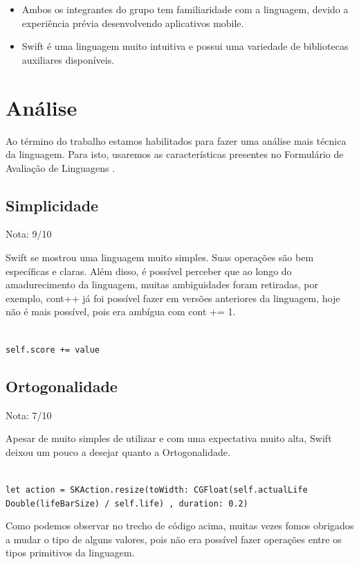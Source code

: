 \documentclass[rel_mlp]{iiufrgs}
\begin{document}
\begin{itemize}[leftmargin=3em]
\setlength{\itemindent}{1em}

    \item Ambos os integrantes do grupo tem familiaridade com a linguagem, devido a experiência prévia desenvolvendo aplicativos mobile.

    \item Swift é uma linguagem muito intuitiva e possui uma variedade de bibliotecas auxiliares disponíveis.

\end{itemize}

\section{Análise}

Ao término do trabalho estamos habilitados para fazer uma análise mais técnica da linguagem. Para isto, usaremos as características presentes no Formulário de Avaliação de Linguagens \cite{catp_01}.

\subsection{Simplicidade}

Nota: 9/10

Swift se mostrou uma linguagem muito simples. Suas operações são bem específicas e claras. Além disso, é possível perceber que ao longo do amadurecimento da linguagem, muitas ambiguidades foram retiradas, por exemplo, cont++ já foi possível fazer em versões anteriores da linguagem, hoje não é mais possível, pois era ambígua com cont += 1.

\texttt{
\\self.score += value
}

\subsection{Ortogonalidade}

Nota: 7/10

Apesar de muito simples de utilizar e com uma expectativa muito alta, Swift deixou um pouco a desejar quanto a Ortogonalidade.

\texttt{
\\let action = SKAction.resize(toWidth: CGFloat(self.actualLife \* Double(lifeBarSize) / self.life) , duration: 0.2)
}

Como podemos observar no trecho de código acima, muitas vezes fomos obrigados a mudar o tipo de alguns valores, pois não era possível fazer operações entre os tipos primitivos da linguagem.
\end{document}
